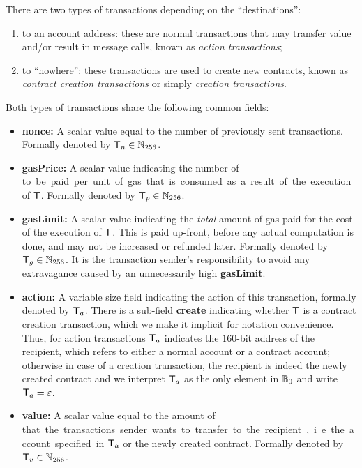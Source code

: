 There are two types of transactions depending on the ``destinations'': 
\begin{enumerate}[nosep]
	\item {to an account address:} these are normal transactions that may transfer value and/or result in message calls, known as \emph{action transactions};

	\item {to ``nowhere'':} these transactions are used to create new contracts, known as \emph{contract creation transactions} or simply \emph{creation transactions}.
\end{enumerate}
Both types of transactions share the following common fields:
\begin{itemize} [nosep]
	\item {\bf nonce:} A scalar value equal to the number of previously sent transactions. Formally denoted by $\textsf{T}_n \in\mathbb{N}_{256}$.

	\item {\bf gasPrice:} A scalar value indicating the number of \unit to be paid per unit of gas that is consumed as a result of the execution of $\textsf{T}$. Formally denoted by $\textsf{T}_p\in\mathbb{N}_{256}$.

	\item {\bf gasLimit:} A scalar value indicating the \emph{total} amount of gas paid for the cost of the execution of $\textsf{T}$. This is paid up-front, before any actual computation is done, and may not be increased or refunded later. 
	Formally denoted by $\textsf{T}_g\in\mathbb{N}_{256}$.
	It is the transaction sender's responsibility to avoid any extravagance caused by an unnecessarily high {\bf gasLimit}.

	\item {\bf action:} 
	A variable size field indicating the action of this transaction, formally denoted by $\textsf{T}_a$. 
	There is a sub-field {\bf create} indicating whether $\textsf{T}$ is a contract creation transaction, which we make it implicit for notation convenience. 
	Thus, for action transactions $\textsf{T}_a$ indicates the $160$-bit address of the recipient, which refers to either a normal account or a contract account;
	otherwise in case of a creation transaction, the recipient is indeed the newly created contract and we interpret $\textsf{T}_a$ as the only element in $\mathbb{B}_0$ and write $\textsf{T}_a = \mathbb{\varepsilon}$.

	\item {\bf value:} A scalar value equal to the amount of \unit that the transactions sender wants to transfer to the recipient, i.e. the account specified in $\textsf{T}_a$ or the newly created contract.
	Formally denoted by $\textsf{T}_v\in\mathbb{N}_{256}$.



\end{itemize}
